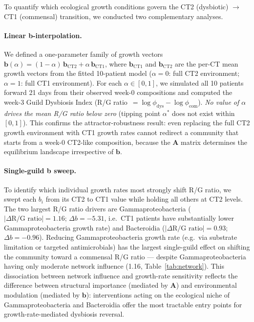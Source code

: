 \documentclass[11pt,a4paper]{article}
\newcommand{\bA}{\mathbf{A}}
\newcommand{\bb}{\mathbf{b}}
\begin{document}
To quantify which ecological growth conditions govern the CT2 (dysbiotic)
$\to$ CT1 (commensal) transition, we conducted two complementary analyses.

\paragraph{Linear b-interpolation.}
We defined a one-parameter family of growth vectors
$\bb(\alpha) = (1-\alpha)\,\bb_{\text{CT2}} + \alpha\,\bb_{\text{CT1}}$,
where $\bb_{\text{CT1}}$ and $\bb_{\text{CT2}}$ are the per-CT mean growth
vectors from the fitted 10-patient model ($\alpha=0$: full CT2 environment;
$\alpha=1$: full CT1 environment).
For each $\alpha \in [0,1]$, we simulated all 10 patients forward 21 days
from their observed week-0 compositions and computed the week-3 Guild
Dysbiosis Index (R/G ratio~$= \log\phi_{\text{dys}} - \log\phi_{\text{com}}$).
\emph{No value of $\alpha$ drives the mean R/G ratio below zero} (tipping point
$\alpha^*$ does not exist within $[0,1]$).
This confirms the attractor-robustness result: even replacing the full
CT2 growth environment with CT1 growth rates cannot redirect a community
that starts from a week-0 CT2-like composition, because the $\bA$ matrix
determines the equilibrium landscape irrespective of $\bb$.

\paragraph{Single-guild b sweep.}
To identify which individual growth rates most strongly shift R/G ratio, we swept
each $b_i$ from its CT2 to CT1 value while holding all others at CT2 levels.
The two largest R/G ratio drivers are Gammaproteobacteria
($|\Delta\text{R/G ratio}|=1.16$; $\Delta b = -5.31$, i.e.\ CT1 patients have
substantially lower Gammaproteobacteria growth rate) and Bacteroidia
($|\Delta\text{R/G ratio}|=0.93$; $\Delta b = -0.96$).
Reducing Gammaproteobacteria growth rate (e.g.\ via substrate limitation
or targeted antimicrobials) has the largest single-guild effect on shifting
the community toward a commensal R/G ratio — despite Gammaproteobacteria having
only moderate network influence (1.16, Table~\ref{tab:network}).
This dissociation between network influence and growth-rate sensitivity
reflects the difference between structural importance (mediated by $\bA$)
and environmental modulation (mediated by $\bb$): interventions acting
on the ecological niche of Gammaproteobacteria and Bacteroidia offer the
most tractable entry points for growth-rate-mediated dysbiosis reversal.
\end{document}
